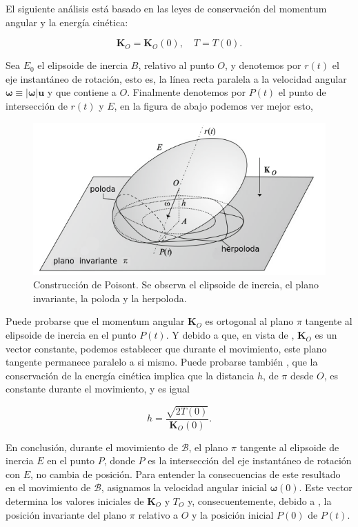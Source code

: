 \documentclass[a4paper,10pt]{article}
\numberwithin{equation}{section}
\begin{document}
El siguiente análisis está basado en las leyes de conservación del momentum angular 
y la energía cinética:

\begin{equation}
 \mathbf{K}_O = \mathbf{K}_O(0), \quad T = T(0).
 \label{eq:poinsot15}
\end{equation}

Sea $E_0$ el elipsoide de inercia $B$, relativo al punto $O$, y denotemos por $r(t)$ el 
eje instantáneo de rotación, esto es, la línea recta paralela a la velocidad angular 
$\mathbf{\omega} \equiv |\mathbf{\omega}|\mathbf{u}$ y que contiene a $O$. Finalmente
denotemos por $P(t)$ el punto de intersección de $r(t)$ y $E$, en la figura de abajo
podemos ver mejor esto,

\begin{figure}[H]
\center
\includegraphics[scale=0.6]{problema5fig1}
\caption{Construcción de Poisont. Se observa el elipsoide de inercia, el plano invariante,
la poloda y la herpoloda.}
\label{fig:problema5fig1}
\end{figure}

Puede probarse que el momentum angular $\mathbf{K}_O$ es ortogonal al plano $\pi$ tangente 
al elipsoide de inercia en el punto $P(t)$. Y debido a que, en vista de ,
$\mathbf{K}_O$ es un vector constante, podemos establecer que durante el movimiento, este 
plano tangente permanece paralelo a si mismo. Puede probarse también \cite{romano}, que 
la conservación de la energía cinética implica que la distancia $h$, de $\pi$ desde $O$, es 
constante durante el movimiento, y es igual 

\begin{equation}
 h = \frac{\sqrt{2T(0)}}{\mathbf{K}_O(0)}.
 \label{eq:poinsot16}
\end{equation}

En conclusión, durante el movimiento de $\mathcal{B}$, el plano $\pi$ tangente al elipsoide
de inercia $E$ en el punto $P$, donde $P$ es la intersección del eje instantáneo de rotación 
con $E$, no cambia de posición. Para entender la consecuencias de este resultado en el 
movimiento de $\mathcal{B}$, asignamos la velocidad angular inicial $\mathbf{\omega}(0)$.
Este vector determina los valores iniciales de $\mathbf{K}_O$ y $T_O$ y, consecuentemente, 
debido a , la posición invariante del plano $\pi$ relativo a $O$ y la 
posición inicial $P(0)$ de $P(t)$.
\end{document}
